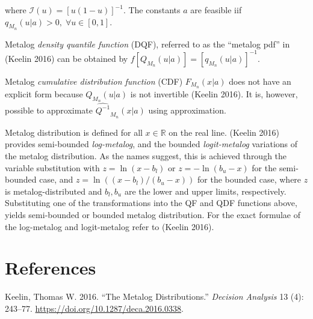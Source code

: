 \documentclass[
  letterpaper,
  DIV=11,
  numbers=noendperiod]{scrartcl}
\newlength{\cslhangindent}
\newenvironment{CSLReferences}[2] %
 {\begin{list}{}{%
  \setlength{\itemindent}{0pt}
  \setlength{\leftmargin}{0pt}
  \setlength{\parsep}{0pt}
  \ifodd #1
   \setlength{\leftmargin}{\cslhangindent}
   \setlength{\itemindent}{-1\cslhangindent}
  \fi
  \setlength{\itemsep}{#2\baselineskip}}}
 {\end{list}}
\begin{document}
where \(\mathcal I(u)=[u(1-u)]^{-1}\). The constants \(a\) are feasible
iif \(q_{M_{n}}(u\vert a)>0, \;\forall u \in [0,1]\).

Metalog \emph{density quantile function} (DQF), referred to as the
``metalog pdf'' in (Keelin 2016) can be obtained by
\(f[Q_{M_n}(u\vert a)]=[q_{M_n}(u\vert a)]^{-1}\).

Metalog \emph{cumulative distribution function} (CDF)
\(F_{M_n}(x\vert a)\) does not have an explicit form because
\(Q_{M_n}(u\vert a)\) is not invertible (Keelin 2016). It is, however,
possible to approximate \(\widehat{Q^{-1}}_{M_n}(x\vert a)\) using
approximation.

Metalog distribution is defined for all \(x \in \mathbb R\) on the real
line. (Keelin 2016) provides semi-bounded \emph{log-metalog}, and the
bounded \emph{logit-metalog} variations of the metalog distribution. As
the names suggest, this is achieved through the variable substitution
with \(z=\ln(x-b_l)\) or \(z=-\ln(b_u-x)\) for the semi-bounded case,
and \(z=\ln((x-b_l)/(b_u-x))\) for the bounded case, where \(z\) is
metalog-distributed and \(b_l, b_u\) are the lower and upper limits,
respectively. Substituting one of the transformations into the QF and
QDF functions above, yields semi-bounded or bounded metalog
distribution. For the exact formulae of the log-metalog and
logit-metalog refer to (Keelin 2016).

\section*{References}\label{references}

\label{refs}
\begin{CSLReferences}{1}{0}
Keelin, Thomas W. 2016. {``The {Metalog Distributions}.''}
\emph{Decision Analysis} 13 (4): 243--77.
\url{https://doi.org/10.1287/deca.2016.0338}.

\end{CSLReferences}
\end{document}
